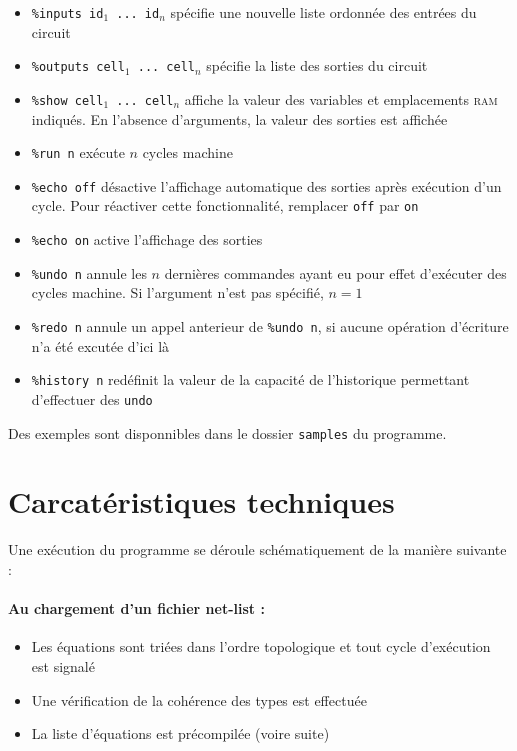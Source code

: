 \documentclass[11pt, a4paper]{article}
\newcommand{\prog}[1]{{\tt#1}}
\begin{document}
\medskip
\begin{center}
\begin{itemize}
   \item \prog{\%inputs id$_1$ ... id$_n$} spécifie une nouvelle liste ordonnée des entrées du circuit
   \item \prog{\%outputs cell$_1$ ... cell$_n$} spécifie la liste des sorties du circuit
   \item \prog{\%show cell$_1$ ... cell$_n$} affiche la valeur des variables et emplacements \textsc{ram} indiqués. En l'absence d'arguments, la valeur des sorties est affichée
   \item \prog{\%run n}  exécute $n$ cycles machine
   \item \prog{\%echo off} désactive l'affichage  automatique des sorties après exécution d'un cycle. Pour réactiver cette fonctionnalité, remplacer \prog{off} par \prog{on}
   \item \prog{\%echo on} active l'affichage des sorties
   \item \prog{\%undo n}  annule les $n$ dernières commandes ayant eu pour effet d'exécuter des cycles machine. Si l'argument n'est pas spécifié, $n=1$
   \item \prog{\%redo n} annule un appel anterieur de \prog{\%undo n}, si aucune opération d'écriture n'a été excutée d'ici là
   \item \prog{\%history n} redéfinit la valeur de la capacité de l'historique permettant d'effectuer des \prog{undo}
   
\end{itemize}
\end{center}

Des exemples sont disponnibles dans le dossier \prog{samples} du programme.
\section{Carcatéristiques techniques}

Une exécution du programme se déroule schématiquement de la manière suivante :

\paragraph{Au chargement d'un fichier net-list :}
\begin{itemize}
\item Les équations sont triées dans l'ordre topologique et tout cycle d'exécution est signalé
\item Une vérification de la cohérence des types est effectuée
\item La liste d'équations est précompilée (voire suite)
\end{itemize}
\end{document}
